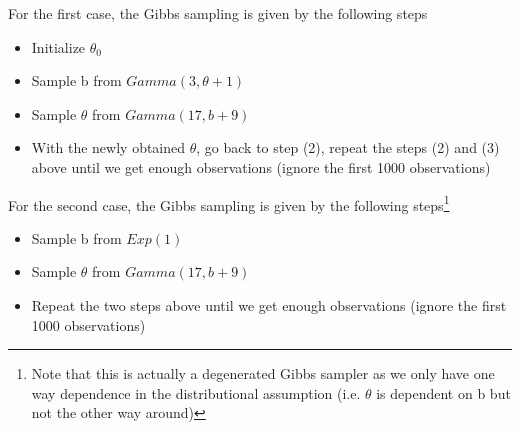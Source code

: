 \documentclass{homeworg}
\begin{document}
For the first case, the Gibbs sampling is given by the following steps
\begin{itemize}
	\item Initialize $\theta_0$
	\item Sample b from $Gamma(3,\theta+1)$
	\item Sample $\theta$ from $Gamma(17,b+9)$
	\item With the newly obtained $\theta$, go back to step (2), repeat the steps (2) and (3) above until we get enough observations (ignore the first 1000 observations)
\end{itemize}

For the second case, the Gibbs sampling is given by the following steps\footnote{Note that this is actually a degenerated Gibbs sampler as we only have one way dependence in the distributional assumption (i.e. $\theta$ is dependent on b but not the other way around)}
\begin{itemize}
\item Sample b from $Exp(1)$
\item Sample $\theta$ from $Gamma(17,b+9)$
\item Repeat the two steps above until we get enough observations (ignore the first 1000 observations)
\end{itemize}
\end{document}

